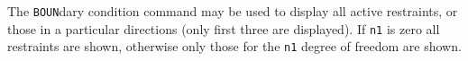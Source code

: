 \headb

The {\tt BOUN}dary condition command may be used to display all active
restraints, or those in a particular directions (only first three are
displayed).  If {\tt n1} is zero all restraints are shown, otherwise
only those for the {\tt n1} degree of freedom are shown.
\vfill
\eject
